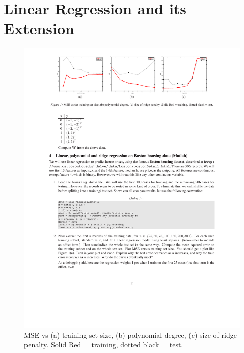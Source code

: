 \documentclass[11pt]{article}
\begin{document}
\section{Linear Regression and its Extension}
\begin{figure}
	\centering
	\includegraphics[width=1\linewidth]{fig}
	\caption{MSE vs (a) training set size, (b) polynomial degree, (c) size of ridge penalty. Solid Red = training, dotted black = test.}
	\label{fig:fig}
\end{figure}
\end{document}
